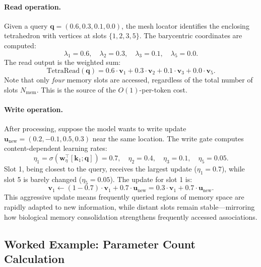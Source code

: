 \paragraph{Read operation.} Given a query $\mathbf{q} = (0.6, 0.3, 0.1, 0.0)$, the mesh locator identifies the enclosing tetrahedron with vertices at slots $\{1, 2, 3, 5\}$. The barycentric coordinates are computed:
\begin{equation*}
  \lambda_1 = 0.6, \quad \lambda_2 = 0.3, \quad \lambda_3 = 0.1, \quad \lambda_5 = 0.0.
\end{equation*}
The read output is the weighted sum:
\begin{equation*}
  \mathrm{TetraRead}(\mathbf{q}) = 0.6 \cdot \mathbf{v}_1 + 0.3 \cdot \mathbf{v}_2 + 0.1 \cdot \mathbf{v}_3 + 0.0 \cdot \mathbf{v}_5.
\end{equation*}
Note that only \emph{four} memory slots are accessed, regardless of the total number of slots $N_{\mathrm{mem}}$. This is the source of the $O(1)$-per-token cost.

\paragraph{Write operation.} After processing, suppose the model wants to write update $\mathbf{u}_{\mathrm{new}} = (0.2, -0.1, 0.5, 0.3)$ near the same location. The write gate computes content-dependent learning rates:
\begin{equation*}
  \eta_1 = \sigma(\mathbf{w}_\eta^\top [\mathbf{k}_1; \mathbf{q}]) = 0.7, \quad \eta_2 = 0.4, \quad \eta_3 = 0.1, \quad \eta_5 = 0.05.
\end{equation*}
Slot 1, being closest to the query, receives the largest update ($\eta_1 = 0.7$), while slot 5 is barely changed ($\eta_5 = 0.05$). The update for slot 1 is:
\begin{equation*}
  \mathbf{v}_1 \leftarrow (1 - 0.7) \cdot \mathbf{v}_1 + 0.7 \cdot \mathbf{u}_{\mathrm{new}} = 0.3 \cdot \mathbf{v}_1 + 0.7 \cdot \mathbf{u}_{\mathrm{new}}.
\end{equation*}
This aggressive update means frequently queried regions of memory space are rapidly adapted to new information, while distant slots remain stable---mirroring how biological memory consolidation strengthens frequently accessed associations.

\subsection{Worked Example: Parameter Count Calculation}
\label{sec:param-count-example}

